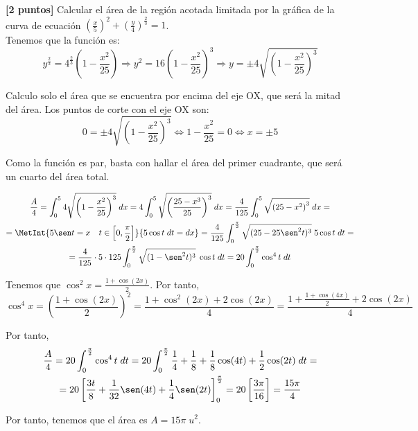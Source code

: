 \documentclass[12pt]{article}
\begin{document}
\begin{ejercicio}\textbf{[2 puntos]}
Calcular el área de la región acotada limitada por la gráfica de la curva de ecuación $\displaystyle \left(\frac{x}{5}\right)^2 +\left(\frac{y}{4}\right)^{\frac{2}{3}}=1$.\\

Tenemos que la función es:
\begin{equation*}
    y^{\frac{2}{3}} = 4^{\frac{2}{3}}\left(1-\frac{x^2}{25}\right) \Longrightarrow y^2=16\left(1-\frac{x^2}{25}\right)^3 \Longrightarrow y=\pm4 \sqrt{\left(1-\frac{x^2}{25}\right)^3 }
\end{equation*}

Calculo solo el área que se encuentra por encima del eje OX, que será la mitad del área. Los puntos de corte con el eje OX son:
\begin{equation*}
    0=\pm4 \sqrt{\left(1-\frac{x^2}{25}\right)^3 }
    \Longleftrightarrow 1-\frac{x^2}{25}=0 \Longleftrightarrow x=\pm 5
\end{equation*}

Como la función es par, basta con hallar el área del primer cuadrante, que será un cuarto del área total.

\begin{multline*}
    \frac{A}{4} = \int_0^5 4 \sqrt{\left(1-\frac{x^2}{25}\right)^3 }
    \;dx= 4\int_0^5 \sqrt{\left(\frac{25-x^3}{25}\right)^3 }\;dx
    = \frac{4}{125}\int_0^5 \sqrt{\left(25-x^2\right)^3 }
    \;dx=\\=
    \MetInt{5\sen t=x\quad t\in \left[0,\frac{\pi}{2}\right]}{5\cos t \;dt=dx}
    = \frac{4}{125}\int_0^{\frac{\pi}{2}} \sqrt{(25-25\sen^2t)^3}\;5\cos t \;dt
    =\\= \frac{4}{125}\cdot 5\cdot 125 \int_0^{\frac{\pi}{2}} \sqrt{(1-\sen^2t)^3}\;\cos t \;dt
    = 20 \int_0^{\frac{\pi}{2}} \cos^4 t \;dt
\end{multline*}

Tenemos que $\cos^2 x = \frac{1+\cos(2x)}{2}$. Por tanto,
\begin{equation*}
    \cos^4 x = \left(\frac{1+\cos(2x)}{2}\right)^2
    = \frac{1+\cos^2(2x)+2\cos(2x)}{4}
    = \frac{1+\frac{1+\cos(4x)}{2}+2\cos(2x)}{4}
\end{equation*}

Por tanto,
\begin{multline*}
    \frac{A}{4}= 20 \int_0^{\frac{\pi}{2}} \cos^4 t \;dt
    = 20 \int_0^{\frac{\pi}{2}} \frac{1}{4} + \frac{1}{8} + \frac{1}{8}\cos(4t) + \frac{1}{2}\cos(2t) \;dt =\\= 20\left[\frac{3t}{8}+\frac{1}{32}\sen(4t) +\frac{1}{4}\sen(2t)\right]_0^{\frac{\pi}{2}} =
    20\left[\frac{3\pi}{16}\right] = \frac{15\pi}{4}
\end{multline*}

Por tanto, tenemos que el área es $A=15\pi\;u^2$.

\end{ejercicio}
\end{document}
